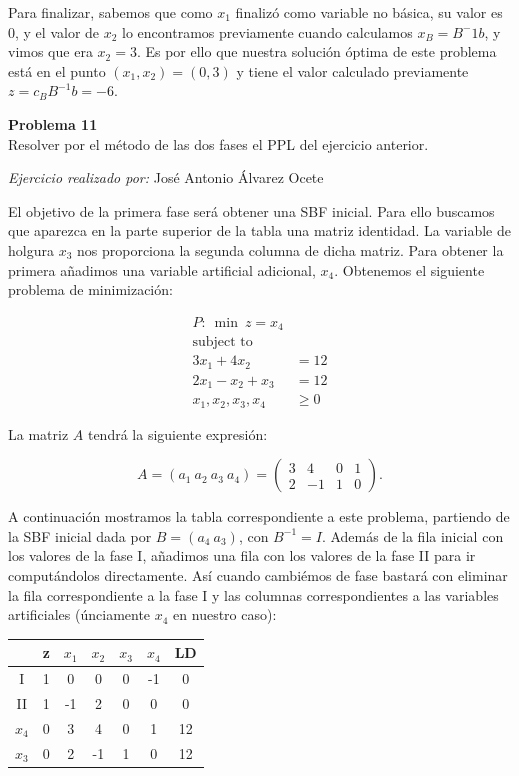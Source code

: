 \documentclass[11pt,table]{article}
\newenvironment{problem}[2][Problema]
    { \begin{mdframed}[backgroundcolor=gray!20] \textbf{#1 #2} \\}
    {  \end{mdframed}}
\begin{document}
\begin{enumerate}
        Para finalizar, sabemos que como \(x_1\) finalizó como variable no básica, su valor es \(0\), y el valor de \(x_2\) lo encontramos previamente cuando calculamos \(x_B = B^-1 b\), y vimos que era \(x_2 = 3\). Es por ello que nuestra solución óptima de este problema está en el punto \((x_1,x_2) = (0,3)\) y tiene el valor calculado previamente \(z = c_B B^{-1} b = -6 \).\\
    \end{enumerate}


\begin{problem}{11}
	Resolver por el método de las dos fases el PPL del ejercicio anterior.
\end{problem}

\emph{Ejercicio realizado por:} José Antonio Álvarez Ocete

El objetivo de la primera fase será obtener una SBF inicial. Para ello buscamos que aparezca en la parte superior de la tabla una matriz identidad. La variable de holgura \(x_3\) nos proporciona la segunda columna de dicha matriz. Para obtener la primera añadimos una variable artificial adicional, \(x_4\). Obtenemos el siguiente problema de minimización:


\begin{align*}
	P: \ \min \ z = x_4\\
	\text{subject to} \\
	3x_{1} + 4x_{2} & = 12 \\
	2x_{1} - x_{2} + x_3 & = 12\\
	x_{1}, x_{2}, x_3, x_4 & \geq 0
\end{align*}


La matriz $A$ tendrá la siguiente expresión:

\[
A = (a_1 \ a_2 \ a_3 \ a_4) =
\begin{pmatrix}
	3 & 4 & 0 & 1\\
	2 & -1 & 1 & 0
\end{pmatrix}.
\]

A continuación mostramos la tabla correspondiente a este problema, partiendo de la SBF inicial dada por $B=(a_4 \ a_3)$, con $B^{-1}=I$. Además de la fila inicial con los valores de la fase I, añadimos una fila con los valores de la fase II para ir computándolos directamente. Así cuando cambiémos de fase bastará con eliminar la fila correspondiente a la fase I y las columnas correspondientes a las variables artificiales (únciamente \(x_4\) en nuestro caso):

\begin{table}[H]
	\centering
	\begin{tabular}{c|c|cccc|c}
		& z & $x_1$ & $x_2$ & $x_3$ & $x_4$ & LD \\
		\hline
		I & 1 & 0 & 0 & 0 & -1 & 0\\
		II & 1 & -1 & 2 & 0 & 0 & 0\\
		\hline
		$x_4$ & 0 & 3 & 4 & 0 & 1 & 12\\
		$x_3$ & 0 & 2 & -1 & 1 & 0 & 12
	\end{tabular}
\end{table}
\end{document}
